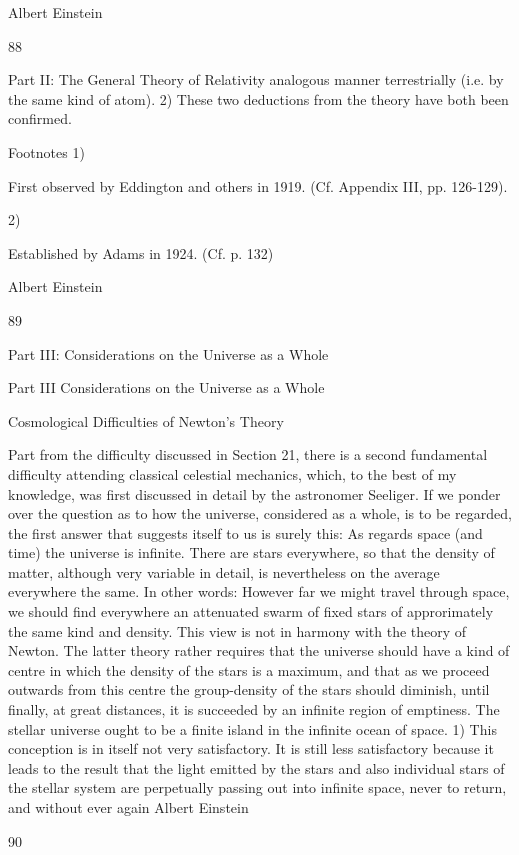 \documentclass{article}
\begin{document}
Albert Einstein

88

Part II: The General Theory of Relativity
analogous manner terrestrially (i.e. by the same kind of atom). 2) These two deductions from
the theory have both been confirmed.

Footnotes
1)

First observed by Eddington and others in 1919. (Cf. Appendix III, pp. 126-129).

2)

Established by Adams in 1924. (Cf. p. 132)

Albert Einstein

89

Part III: Considerations on the Universe as a Whole

Part III
Considerations on the Universe as a Whole

Cosmological Difficulties of
Newton's Theory

Part from the difficulty discussed in Section 21, there is a second fundamental difficulty
attending classical celestial mechanics, which, to the best of my knowledge, was first
discussed in detail by the astronomer Seeliger. If we ponder over the question as to how the
universe, considered as a whole, is to be regarded, the first answer that suggests itself to us
is surely this: As regards space (and time) the universe is infinite. There are stars
everywhere, so that the density of matter, although very variable in detail, is nevertheless on
the average everywhere the same. In other words: However far we might travel through
space, we should find everywhere an attenuated swarm of fixed stars of approrimately the
same kind and density.
This view is not in harmony with the theory of Newton. The latter theory rather requires
that the universe should have a kind of centre in which the density of the stars is a
maximum, and that as we proceed outwards from this centre the group-density of the stars
should diminish, until finally, at great distances, it is succeeded by an infinite region of
emptiness. The stellar universe ought to be a finite island in the infinite ocean of space. 1)
This conception is in itself not very satisfactory. It is still less satisfactory because it leads
to the result that the light emitted by the stars and also individual stars of the stellar system
are perpetually passing out into infinite space, never to return, and without ever again
Albert Einstein

90
\end{document}
